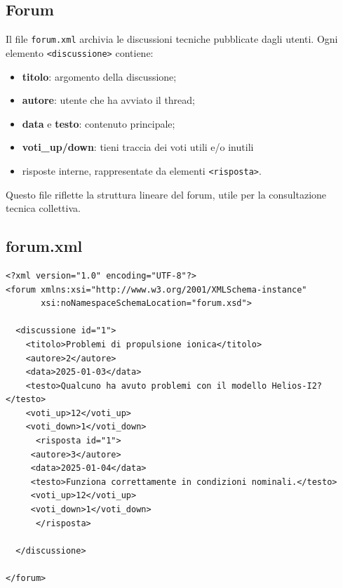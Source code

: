 \documentclass[a4paper,12pt]{report}
\begin{document}
\subsection*{Forum}
\label{sec:xml-forum}

Il file \texttt{forum.xml} archivia le discussioni tecniche pubblicate dagli utenti.
Ogni elemento \texttt{<discussione>} contiene:

\begin{itemize}
    \item \textbf{titolo}: argomento della discussione;
    \item \textbf{autore}: utente che ha avviato il thread;
    \item \textbf{data} e \textbf{testo}: contenuto principale;
    \item \textbf{voti_up/down}: tieni traccia dei voti utili e/o inutili
    \item risposte interne, rappresentate da elementi \texttt{<risposta>}.
\end{itemize}

Questo file riflette la struttura lineare del forum, utile per la consultazione
tecnica collettiva.

\subsection*{forum.xml}
{\footnotesize
\begin{lstlisting}
<?xml version="1.0" encoding="UTF-8"?>
<forum xmlns:xsi="http://www.w3.org/2001/XMLSchema-instance"
       xsi:noNamespaceSchemaLocation="forum.xsd">

  <discussione id="1">
    <titolo>Problemi di propulsione ionica</titolo>
    <autore>2</autore>
    <data>2025-01-03</data>
    <testo>Qualcuno ha avuto problemi con il modello Helios-I2?</testo>
    <voti_up>12</voti_up>
    <voti_down>1</voti_down>
      <risposta id="1">
     <autore>3</autore>
     <data>2025-01-04</data>
     <testo>Funziona correttamente in condizioni nominali.</testo>
     <voti_up>12</voti_up>
     <voti_down>1</voti_down>
      </risposta>

  </discussione>

</forum>
\end{lstlisting}}
\end{document}
